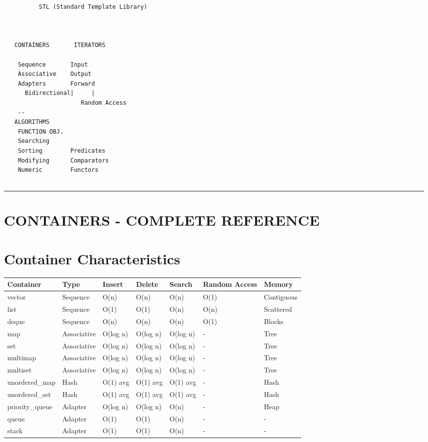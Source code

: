 \begin{lstlisting}
          STL (Standard Template Library)  

                                           
         
   CONTAINERS       ITERATORS          
         
    Sequence       Input             
    Associative    Output            
    Adapters       Forward           
      Bidirectional|     |
                      Random Access     
    --     
   ALGORITHMS            
    FUNCTION OBJ.        
    Searching           
    Sorting        Predicates        
    Modifying      Comparators       
    Numeric        Functors          
           
\end{lstlisting}

\begin{center}\rule{0.5\linewidth}{0.5pt}\end{center}

\hypertarget{containers---complete-reference}{%
\section{CONTAINERS - COMPLETE
REFERENCE}\label{containers---complete-reference}}

\hypertarget{container-characteristics}{%
\section{Container Characteristics}\label{container-characteristics}}

\begin{longtable}[]{@{}lllllll@{}}
\toprule
Container & Type & Insert & Delete & Search & Random Access & Memory \\
\midrule
\endhead
vector & Sequence & O(n) & O(n) & O(n) & O(1) & Contiguous \\
list & Sequence & O(1) & O(1) & O(n) & O(n) & Scattered \\
deque & Sequence & O(n) & O(n) & O(n) & O(1) & Blocks \\
map & Associative & O(log n) & O(log n) & O(log n) & - & Tree \\
set & Associative & O(log n) & O(log n) & O(log n) & - & Tree \\
multimap & Associative & O(log n) & O(log n) & O(log n) & - & Tree \\
multiset & Associative & O(log n) & O(log n) & O(log n) & - & Tree \\
unordered\_map & Hash & O(1) avg & O(1) avg & O(1) avg & - & Hash \\
unordered\_set & Hash & O(1) avg & O(1) avg & O(1) avg & - & Hash \\
priority\_queue & Adapter & O(log n) & O(log n) & O(n) & - & Heap \\
queue & Adapter & O(1) & O(1) & O(n) & - & - \\
stack & Adapter & O(1) & O(1) & O(n) & - & - \\
\bottomrule
\end{longtable}

